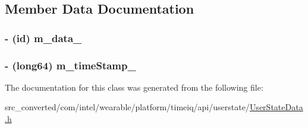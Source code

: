 \subsection{Member Data Documentation}
\hypertarget{interface_user_state_data_ad61b0fe3306f1569edaca391ce3e1a96}{}
\subsubsection[{m\+\_\+data\+\_\+}]{\setlength{\rightskip}{0pt plus 5cm}-\/ (id) m\+\_\+data\+\_\+}\label{interface_user_state_data_ad61b0fe3306f1569edaca391ce3e1a96}
\hypertarget{interface_user_state_data_adc190d8e2ee84f5e7eedf8a3313d40fa}{}
\subsubsection[{m\+\_\+time\+Stamp\+\_\+}]{\setlength{\rightskip}{0pt plus 5cm}-\/ (long64) m\+\_\+time\+Stamp\+\_\+}\label{interface_user_state_data_adc190d8e2ee84f5e7eedf8a3313d40fa}


The documentation for this class was generated from the following file\+:\begin{DoxyCompactItemize}
\item 
src\+\_\+converted/com/intel/wearable/platform/timeiq/api/userstate/\hyperlink{_user_state_data_8h}{User\+State\+Data.\+h}\end{DoxyCompactItemize}
